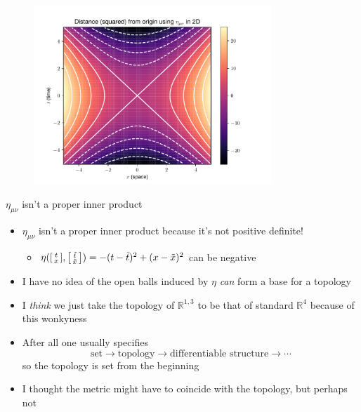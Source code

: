 \documentclass[11pt,aspectratio=1610,xcolor=dvipsnames]{beamer}
\newcommand{\R}{\mathbb{R}}
\begin{document}
\begin{frame}
	\begin{figure}
		\includegraphics[width=0.8\textwidth]{contour.pdf}
	\end{figure}
\end{frame}

\begin{frame}{$\eta_{\mu\nu}$ isn't a proper inner product}
	\begin{itemize}[<+->]
		\item $\eta_{\mu\nu}$ isn't a proper inner product because it's not positive definite!
		      \begin{itemize}
			      \item $\eta(\smqty[t \\ x], \smqty[\tilde{t} \\ \tilde{x}]) = -(t - \tilde{t})^2 + (x - \tilde{x})^2$ can be negative
		      \end{itemize}
		\item I have no idea of the open balls induced by $\eta$ \emph{can} form a base for a topology
		\item I \emph{think} we just take the topology of $\R^{1,3}$ to be that of standard $\R^4$ because of this wonkyness
		\item After all one usually specifies
		      \begin{equation*}
			      \text{set} \longrightarrow \text{topology} \longrightarrow \text{differentiable structure} \longrightarrow \cdots
		      \end{equation*}
		      so the topology is set from the beginning
		\item I thought the metric might have to coincide with the topology, but perhaps not
	\end{itemize}
\end{frame}
\end{document}
